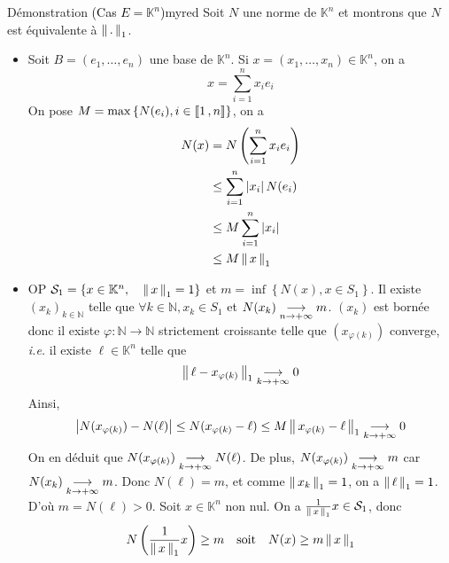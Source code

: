     \begin{demo}{Démonstration \textcolor{black}{(Cas $E = \mathbb{K}^n$)}}{myred}
        Soit $N$ une norme de $\mathbb{K}^n$ et montrons que $N$ est équivalente à $\norm{.}_1$. 
        \begin{itemize}
            \item Soit $B = (e_1, \ldots, e_n)$ une base de $\mathbb{K}^n$. Si $x = (x_1,\ldots,x_n) \in \mathbb{K}^n$, on a 
            \[ x = \sum_{i=1}^{n} x_i e_i \]   
            On pose $M = \max\left\{N(e_i), i \in \intervalleEntier{1}{n}\right\}$, on a 
            \begin{align*}
                N(x) 
                &= N\left(\sum_{i=1}^{n} x_i e_i\right) \\
                &\leq \sum_{i=1}^{n} \abs{x_i} N(e_i) \\
                &\leq M \sum_{i=1}^{n} \abs{x_i} \\
                &\leq M \norm{x}_1
            \end{align*}
            \item OP $\mathcal{S}_1 = \left\{x \in \mathbb{K}^n, \quad \nnorm{1}{x} = 1\right\}$ et $m = \inf\left\{N(x), x \in S_1\right\}$. Il existe $(x_k)_{k \in \mathbb{N}}$ telle que $\forall k \in \mathbb{N}, x_k \in S_1$ et $N(x_k) \limi{n}{+\infty} m$. $(x_k)$ est bornée donc il existe $\varphi : \mathbb{N} \to \mathbb{N}$ strictement croissante telle que $(x_{\varphi(k)})$ converge, \textit{i.e.} il existe $\ell \in \mathbb{K}^n$ telle que 
            \[ \nnorm{1}{\ell - x_{\varphi(k)}} \limi{k}{+\infty} 0 \]   
            Ainsi, 
            \[ \abs{N(x_{\varphi(k)}) - N(\ell)} \leq N(x_{\varphi(k)} - \ell) \leq M \nnorm{1}{x_{\varphi(k)} - \ell} \limi{k}{+\infty} 0 \]   
            On en déduit que $N(x_{\varphi(k)}) \limi{k}{+\infty} N(\ell)$. De plus, $N(x_{\varphi(k)}) \limi{k}{+\infty} m$ car $N(x_k) \limi{k}{+\infty} m$. Donc $N(\ell) = m$, et comme $\nnorm{1}{x_k} = 1$, on a $\nnorm{1}{\ell} = 1$. D’où $m = N(\ell) > 0$. Soit $x \in \mathbb{K}^n$ non nul. On a $\frac{1}{\nnorm{1}{x}}x \in \mathcal{S}_1$, donc 
            \[ N\left(\frac{1}{\nnorm{1}{x}} x\right) \geq m \esp{soit} N(x)\geq m \nnorm{1}{x} \]    
        \end{itemize}
    \end{demo}


